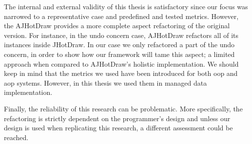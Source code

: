 The internal and external validity of this thesis is satisfactory since our focus was narrowed to a representative case and predefined and tested metrics.
However, the AJHotDraw provides a more complete aspect refactoring of the original version.
For instance, in the undo concern case, AJHotDraw refactors all of its instances inside JHotDraw. 
In our case we only refactored a part of the undo concern, in order to show how our framework will tame this aspect; a limited approach when compared to AJHotDraw's holistic implementation.
We should keep in mind that the metrics we used have been introduced for both \ac{oop} and \ac{aop} systems.
However, in this thesis we used them in managed data implementation. 

Finally, the reliability of this research can be problematic.
More specifically, the refactoring is strictly dependent on the programmer's design and unless our design is used when replicating this research, a different assessment could be reached.
